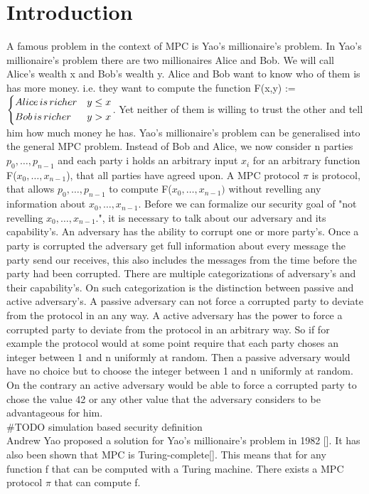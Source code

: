 \chapter {Introduction}
A famous problem in the context of MPC is Yao's millionaire's problem. In Yao's millionaire's problem there are two millionaires Alice and Bob. We will call Alice's wealth x and Bob's wealth y. Alice and Bob want to know who of them is has more money. i.e. they want to compute the function F(x,y) := $ 
\begin{dcases} 
	Alice \,  is \, richer   &  y \leq  x \\
	Bob \, is \, richer   &  y > x  \\
\end{dcases}  $. Yet neither of them is willing to trust the other and tell him how much money he has. 
Yao's millionaire's problem can be generalised into the general MPC problem.    Instead of Bob and Alice, we now consider n parties $ p_0,\dots,p_{n-1} $ and each party i holds an arbitrary input  $ x_i $ for an arbitrary function F($ x_0,\dots,x_{n-1}$),  that all parties have agreed upon.  
A MPC protocol $ \pi $  is protocol, that allows  $ p_0,\dots,p_{n-1} $ to compute F($ x_0,\dots,x_{n-1} )$ without revelling any information about $ x_0,\dots,x_{n-1}. $
Before we can formalize our security goal of "not revelling $ x_0,\dots,x_{n-1}. $", it is necessary to talk about our adversary and its capability's.  An adversary has the ability to corrupt one or more party's. Once a party is corrupted the adversary get full information about every message the party send our receives, this also includes the messages from the time before the party had been corrupted. There are multiple categorizations of adversary's  and their capability's. On such categorization is the distinction between passive and active adversary's. A passive adversary can not force a corrupted party to deviate from the protocol in an any way. A active adversary has the power to force a corrupted party to deviate from the protocol in an arbitrary way. So if for example the protocol would at some point require that each party choses an integer between 1 and n uniformly at random.  Then a passive adversary would have no choice but to choose the integer between 1 and n uniformly at random. On the contrary an active adversary would be able to force a corrupted party to chose the value 42 or any other value that the adversary considers to be advantageous for him.       
\\#TODO simulation based security definition
\\

             
Andrew Yao proposed a solution for Yao's millionaire's problem in 1982 [].  It has also been shown that MPC is Turing-complete[]. This means that for any function f that can be computed with a Turing machine. There exists a MPC protocol $ \pi $ that can compute f.    








